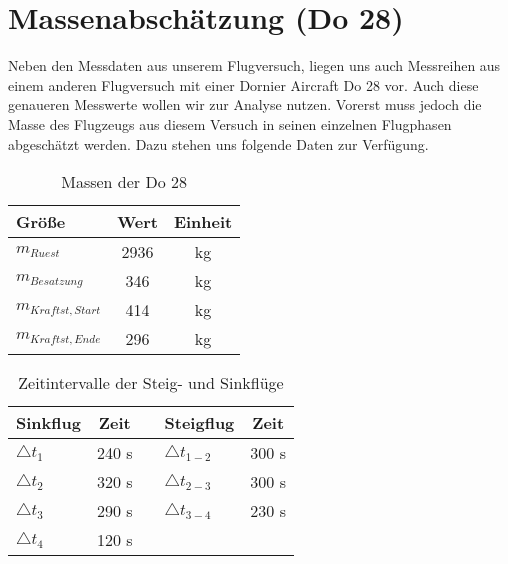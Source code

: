 \chapter{Massenabschätzung (Do 28)}
\label{chapter:masse}
Neben den Messdaten aus unserem Flugversuch, liegen uns auch Messreihen aus einem anderen Flugversuch mit einer Dornier Aircraft Do 28 vor. Auch diese genaueren Messwerte wollen wir zur Analyse nutzen. Vorerst muss jedoch die Masse des Flugzeugs aus diesem Versuch in seinen einzelnen Flugphasen abgeschätzt werden. Dazu stehen uns folgende Daten zur Verfügung. \\

\begin{table}[h]
	\centering
	\begin{tabular}{|l|c|c|}
		\hline
	\textbf{Größe}		 & \textbf{Wert}& \textbf{Einheit} \\ \hline
	$m_{Ruest}$  		 & 2936			& {kg}        \\ \hline
	$m_{Besatzung}$ 	 & 346			& {kg}		  \\ \hline
	$m_{Kraftst,Start}$	 & 414			& {kg}		  \\ \hline
	$m_{Kraftst,Ende}$	 & 296			& {kg}		  \\ \hline
		


\end{tabular}
	\caption{Massen der Do 28}
\end{table}


\begin{table}[h]
	\centering
	\begin{tabular}{|l|c|c|l|c|}
		\hline
		\textbf{Sinkflug}		 & \textbf{Zeit}& \textbf{} & \textbf{Steigflug} & \textbf{Zeit} \\ \hline
		$\triangle t_1$  & 240 {s} & & $\triangle t_{1-2}$ & 300 s         \\ \hline
		$\triangle t_2$  & 320 {s} & & $\triangle t_{2-3}$ & 300 s		  \\ \hline
		$\triangle t_3$	 & 290 {s} & & $\triangle t_{3-4}$ & 230 s	  \\ \hline
		$\triangle t_4$	 & 120 {s} & &	&	  \\ \hline
	
	  \hline
		
		
		
	\end{tabular}
	\caption{Zeitintervalle der Steig- und Sinkflüge} \label{tab:do28-deltat}
\end{table} 
\vspace{0.3cm} 

